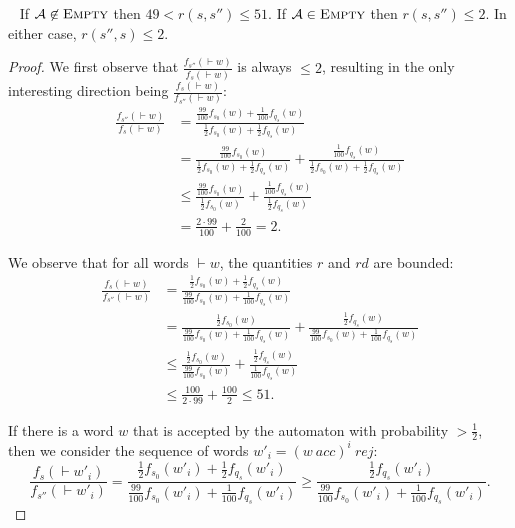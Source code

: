 \documentclass[10pt,a4paper]{amsart}
\numberwithin{equation}{section}
\theoremstyle{plain}
\theoremstyle{definition}
\theoremstyle{remark}
\newcommand\acc{\mathit{acc}}
\newcommand\rej{\mathit{rej}}
\newcommand\tvra{\mathit{r}}
\newcommand\tvrs{\mathit{rd}}
\newcommand\pa{\mathcal{A}}
\renewcommand\nu{f}
\begin{document}
\begin{lem}\label{claim:gapproblem}~
If $\pa \not\in\textsc{Empty}$ then $49 < \tvra(s,s'') \le 51$.
If $\pa\in\textsc{Empty}$ then $\tvra(s,s'') \le 2$. In either case, $\tvra(s'',s) \le 2$.
\end{lem}

\begin{proof}

We first observe that $\frac{\nu_{s''}({\vdash} w)}{\nu_s({\vdash} w)}$ is always $\le 2$, resulting in the only interesting direction being $\frac{\nu_s({\vdash} w)}{\nu_{s''}({\vdash} w)}$:
\begin{align*}
\frac{\nu_{s''}({\vdash} w)}{\nu_s({\vdash} w)}
&= \frac{\frac{99}{100}\nu_{s_0}(w)+ \frac{1}{100}\nu_{q_s}(w)}{\frac{1}{2}\nu_{s_0}(w) + \frac{1}{2}\nu_{q_s}(w)}
\\&= \frac{\frac{99}{100}\nu_{s_0}(w)}{\frac{1}{2}\nu_{s_0}(w) + \frac{1}{2}\nu_{q_s}(w)}+\frac{\frac{1}{100}\nu_{q_s}(w)}{\frac{1}{2}\nu_{s_0}(w) + \frac{1}{2}\nu_{q_s}(w)}
\\ & \le \frac{\frac{99}{100}\nu_{s_0}(w)}{\frac{1}{2}\nu_{s_0}(w)}+\frac{\frac{1}{100}\nu_{q_s}(w)}{\frac{1}{2}\nu_{q_s}(w)}
\\ & = \frac{2 \cdot 99}{100}+ \frac{2}{100} = 2.
\end{align*}

We observe that for all words ${\vdash} w$, the quantities $\tvra$ and $\tvrs$ are bounded:
\begin{align*}
\frac{\nu_s({\vdash} w)}{\nu_{s''}({\vdash} w)}
&= \frac{\frac{1}{2}\nu_{s_0}(w) + \frac{1}{2}\nu_{q_s}(w)}{\frac{99}{100}\nu_{s_0}(w)+ \frac{1}{100}\nu_{q_s}(w)}
\\&= \frac{\frac{1}{2}\nu_{s_0}(w)}{\frac{99}{100}\nu_{s_0}(w)+ \frac{1}{100}\nu_{q_s}(w)} +  \frac{\frac{1}{2}\nu_{q_s}(w)}{\frac{99}{100}\nu_{s_0}(w)+ \frac{1}{100}\nu_{q_s}(w)}
\\ & \le \frac{\frac{1}{2}\nu_{s_0}(w)}{\frac{99}{100}\nu_{s_0}(w)} +  \frac{\frac{1}{2}\nu_{q_s}(w)}{\frac{1}{100}\nu_{q_s}(w)}
\\ & \le \frac{100}{2\cdot 99} + \frac{100}{2} \le 51.
\end{align*}

If there is a word $w$ that is accepted by the automaton with probability
$>\frac{1}{2}$, then we consider the sequence of words $w'_i = (w\ \acc)^i\ \rej$:
\begin{equation*}
\frac{\nu_s({\vdash}w'_i)}{\nu_{s''}({\vdash}w'_i)}= \frac{\frac{1}{2}\nu_{s_0}(w'_i) + \frac{1}{2}\nu_{q_s}(w'_i)}{\frac{99}{100}\nu_{s_0}(w'_i)+ \frac{1}{100}\nu_{q_s}(w'_i)}
\ge \frac{\frac{1}{2}\nu_{q_s}(w'_i)}{\frac{99}{100}\nu_{s_0}(w'_i)+ \frac{1}{100}\nu_{q_s}(w'_i)}. \end{equation*}


\end{proof}
\end{document}
